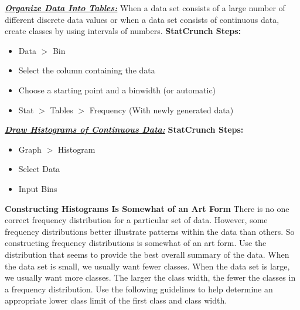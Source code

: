 \documentclass{report}
\begin{document}

        \bigbreak \noindent \bigbreak \noindent 
        \textbf{\textit{\underline{Organize Data Into Tables:}}}
        \bigbreak \noindent 
        When a data set consists of a large number of different discrete data values or when a data set consists of continuous data, create classes by using intervals of numbers.
        \bigbreak \noindent 
        \textbf{StatCrunch Steps:}
        \begin{itemize}
            \item Data $>$ Bin
            \item Select the column containing the data
            \item Choose a starting point and a binwidth (or automatic)
            \item Stat $>$ Tables $>$ Frequency (With newly generated data)
        \end{itemize}

        \bigbreak \noindent \bigbreak \noindent 
        \textbf{\textit{\underline{Draw Histograms of Continuous Data:}}}
        \bigbreak \noindent 
        \textbf{StatCrunch Steps:}
        \begin{itemize}
            \item Graph $>$ Histogram
            \item Select Data
            \item Input Bins
        \end{itemize}
        \textbf{Constructing Histograms Is Somewhat of an Art Form}
        \bigbreak \noindent 
        There is no one correct frequency distribution for a particular set of data. However, some frequency distributions better illustrate patterns within the data than others. So constructing frequency distributions is somewhat of an art form. Use the distribution that seems to provide the best overall summary of the data.
        \bigbreak \noindent 
         When the data set is small, we usually want fewer classes. When the data set is large, we usually want more classes. The larger the class width, the fewer the classes in a frequency distribution. Use the following guidelines to help determine an appropriate lower class limit of the first class and class width.
\end{document}
